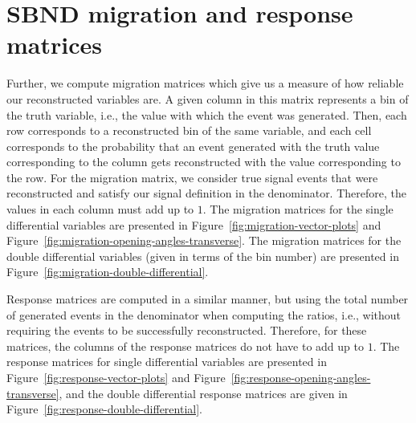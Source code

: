 \documentclass{article}
\begin{document}
\section{SBND migration and response matrices}

Further, we compute migration matrices which give us a measure of how reliable our reconstructed variables are. A given column in this matrix represents a bin of the truth variable, i.e., the value with which the event was generated. Then, each row corresponds to a reconstructed bin of the same variable, and each cell corresponds to the probability that an event generated with the truth value corresponding to the column gets reconstructed with the value corresponding to the row. For the migration matrix, we consider true signal events that were reconstructed and satisfy our signal definition in the denominator. Therefore, the values in each column must add up to $1$. The migration matrices for the single differential variables are presented in Figure~\ref{fig:migration-vector-plots} and Figure~\ref{fig:migration-opening-angles-transverse}. The migration matrices for the double differential variables (given in terms of the bin number) are presented in Figure~\ref{fig:migration-double-differential}.

Response matrices are computed in a similar manner, but using the total number of generated events in the denominator when computing the ratios, i.e., without requiring the events to be successfully reconstructed. Therefore, for these matrices, the columns of the response matrices do not have to add up to $1$. The response matrices for single differential variables are presented in Figure~\ref{fig:response-vector-plots} and Figure~\ref{fig:response-opening-angles-transverse}, and the double differential response matrices are given in Figure~\ref{fig:response-double-differential}.
\end{document}

